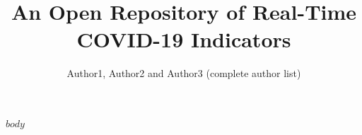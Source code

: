 \documentclass[9pt,twoside,lineno]{pnas-new}
\title{An Open Repository of Real-Time COVID-19 Indicators}
\author{Author1, Author2 and Author3 (complete author list)}
\begin{document}
$body$







\end{document}
